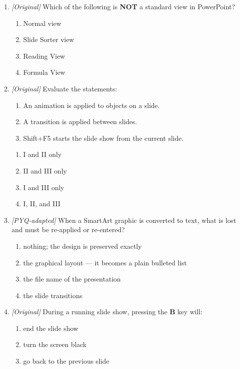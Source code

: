 \documentclass[11pt]{article}
\begin{document}
\begin{enumerate}[label=\textbf{Q\arabic*.}, leftmargin=*]
\begin{enumerate}[label=\Alph*.]
    \item Slide Show view
  \end{enumerate}
\item \textit{[Original]} Which of the following is \textbf{NOT} a standard view
  in PowerPoint?
  \begin{enumerate}[label=\Alph*.]
    \item Normal view
    \item Slide Sorter view
    \item Reading View
    \item Formula View
  \end{enumerate}
\item \textit{[Original]} Evaluate the statements:
  \begin{enumerate}[label=\Roman*.]
    \item An animation is applied to objects on a slide.
    \item A transition is applied between slides.
    \item Shift+F5 starts the slide show from the current slide.
  \end{enumerate}
  \begin{enumerate}[label=\Alph*.]
    \item I and II only
    \item II and III only
    \item I and III only
    \item I, II, and III
  \end{enumerate}
\item \textit{[PYQ-adapted]} When a SmartArt graphic is converted to text, what
  is lost and must be re-applied or re-entered?
  \begin{enumerate}[label=\Alph*.]
    \item nothing; the design is preserved exactly
    \item the graphical layout --- it becomes a plain bulleted list
    \item the file name of the presentation
    \item the slide transitions
  \end{enumerate}
\item \textit{[Original]} During a running slide show, pressing the
\textbf{B} key will:
  \begin{enumerate}[label=\Alph*.]
    \item end the slide show
    \item turn the screen black
    \item go back to the previous slide

\end{enumerate}
\end{enumerate}
\end{document}
